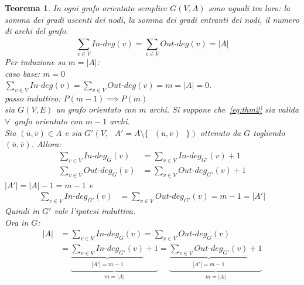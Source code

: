 \documentclass[a4paper, openany]{book}
\theoremstyle{plain}
\newtheorem{thm}{Teorema}[section]
\theoremstyle{definition}
\begin{document}
\begin{thm}
In ogni grafo orientato semplice $G(V,A)$ sono uguali tra loro: la somma dei gradi
uscenti dei nodi, la somma dei gradi entranti dei nodi, il numero di archi del grafo.
\begin{equation}
{\sum_{v \in V}^{} In\text{-}deg(v)} = {\sum_{v \in V}^{} Out\text{-}deg(v)} = |A|
\label{eq:thm2}
\end{equation}
\proof
    Per induzione su $m = |A|$:\\
    \emph{caso base: $m = 0$}\\ 
    \indent $\sum_{v \in V}^{} In\text{-}deg(v) = \sum_{v \in V}^{} Out\text{-}deg(v) =
    m = |A| = 0$.\\
    \emph{passo induttivo:} $P(m-1) \implies P(m)$\\
    \indent sia $G(V,E)$ un grafo orientato con $m$ archi. Si suppone che~\ref{eq:thm2} 
    sia valida $\forall$~grafo orientato con $m-1$ archi.\\
    Sia $(\bar{u}, \bar{v}) \in A$ e sia 
    $G'(V, \text{ } A'=A \setminus \{\text{ } (\bar{u}, \bar{v}) \text{ }\})$ 
    ottenuto da $G$ togliendo $(\bar{u}, \bar{v})$. Allora:
    \begin{align*}
        \sum_{v \in V}^{} {In\text{-}deg_{G}(v)} & = \sum_{v \in V}^{} {In\text{-}deg_{G'}(v)} + 1\\
        \sum_{v \in V}^{} Out\text{-}deg_{G}(v) & = \sum_{v \in V}^{} Out\text{-}deg_{G'}(v) + 1
    \end{align*}
    $|A'| = |A| - 1 = m - 1$ e
    \begin{align*}
        \sum_{v \in V}^{} {In\text{-}deg_{G'}(v)} & = \sum_{v \in V}^{} {Out\text{-}deg_{G'}(v)} = 
        m - 1 = |A'|
    \end{align*}
    Quindi in $G'$ vale l'ipotesi induttiva.\\Ora in $G$:
    \begin{equation*}
    \begin{split}
        |A| & = \sum_{v \in V}^{} {In\text{-}deg_{G}(v)} = \sum_{v \in V}^{} {Out\text{-}deg_{G}(v)}\\
    & =\underbrace{\underbrace{\sum_{v \in V}^{} {In\text{-}deg_{G'}(v)}}_{|A'| = m-1}+1}_{m=|A|} =
        \underbrace{\underbrace{\sum_{v \in V}^{} {Out\text{-}deg_{G'}(v)}}_{|A'| = m-1}+1}_{m=|A|}
    \end{split}
    \end{equation*}
\endproof
\end{thm}
\end{document}
